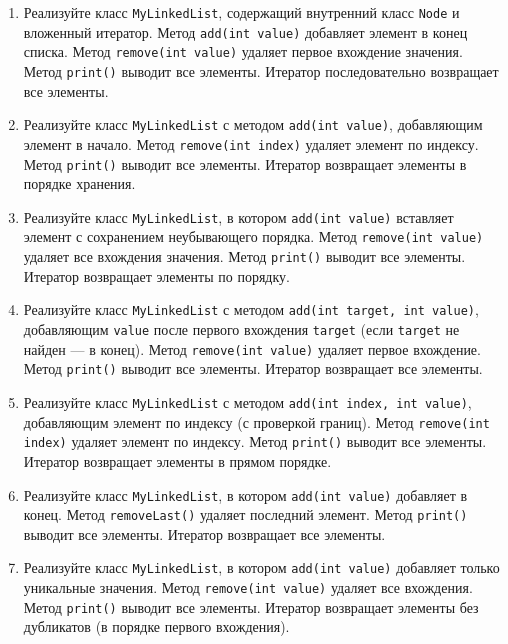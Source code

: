 \documentclass[12pt]{article}
\begin{document}
\begin{enumerate}
\item Реализуйте класс \texttt{MyLinkedList}, содержащий внутренний класс \texttt{Node} и вложенный итератор. Метод \texttt{add(int value)} добавляет элемент в конец списка. Метод \texttt{remove(int value)} удаляет первое вхождение значения. Метод \texttt{print()} выводит все элементы. Итератор последовательно возвращает все элементы.

\item Реализуйте класс \texttt{MyLinkedList} с методом \texttt{add(int value)}, добавляющим элемент в начало. Метод \texttt{remove(int index)} удаляет элемент по индексу. Метод \texttt{print()} выводит все элементы. Итератор возвращает элементы в порядке хранения.

\item Реализуйте класс \texttt{MyLinkedList}, в котором \texttt{add(int value)} вставляет элемент с сохранением неубывающего порядка. Метод \texttt{remove(int value)} удаляет все вхождения значения. Метод \texttt{print()} выводит все элементы. Итератор возвращает элементы по порядку.

\item Реализуйте класс \texttt{MyLinkedList} с методом \texttt{add(int target, int value)}, добавляющим \texttt{value} после первого вхождения \texttt{target} (если \texttt{target} не найден — в конец). Метод \texttt{remove(int value)} удаляет первое вхождение. Метод \texttt{print()} выводит все элементы. Итератор возвращает все элементы.

\item Реализуйте класс \texttt{MyLinkedList} с методом \texttt{add(int index, int value)}, добавляющим элемент по индексу (с проверкой границ). Метод \texttt{remove(int index)} удаляет элемент по индексу. Метод \texttt{print()} выводит все элементы. Итератор возвращает элементы в прямом порядке.

\item Реализуйте класс \texttt{MyLinkedList}, в котором \texttt{add(int value)} добавляет в конец. Метод \texttt{removeLast()} удаляет последний элемент. Метод \texttt{print()} выводит все элементы. Итератор возвращает все элементы.

\item Реализуйте класс \texttt{MyLinkedList}, в котором \texttt{add(int value)} добавляет только уникальные значения. Метод \texttt{remove(int value)} удаляет все вхождения. Метод \texttt{print()} выводит все элементы. Итератор возвращает элементы без дубликатов (в порядке первого вхождения).


\end{enumerate}
\end{document}
